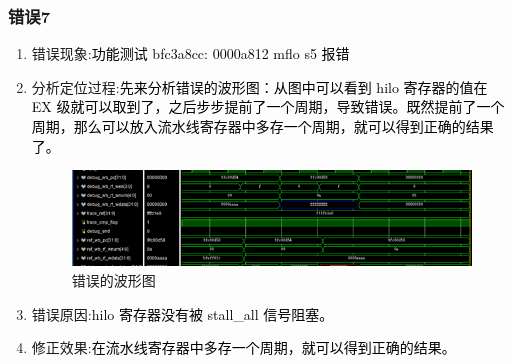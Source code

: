 \subsubsection{错误7}
\begin{enumerate}[(1)]
    \item 错误现象:\textcolor{black}{功能测试 bfc3a8cc: 0000a812 mflo s5 报错}
    \item 分析定位过程:\textcolor{black}{先来分析错误的波形图：从图中可以看到 hilo 寄存器的值在 EX 级就可以取到了，之后步步提前了一个周期，导致错误。既然提前了一个周期，那么可以放入流水线寄存器中多存一个周期，就可以得到正确的结果了。}
    
    \begin{figure}[htbp]
        \centering
        \includegraphics[width=\textwidth]{image/wave5.png}
        \caption{错误的波形图}
    \end{figure}
    
    \item 错误原因:\textcolor{black}{hilo 寄存器没有被 stall\_all 信号阻塞。}
    \item 修正效果:\textcolor{black}{在流水线寄存器中多存一个周期，就可以得到正确的结果。}
\end{enumerate}